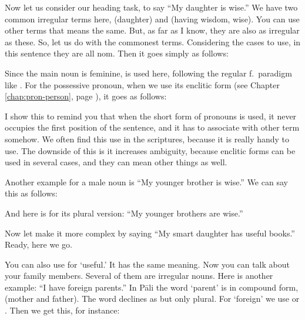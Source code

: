 Now let us consider our heading task, to say ``My daughter is wise.'' We have two common irregular terms here,  (daughter) and  (having wisdom, wise). You can use other terms that means the same. But, as far as I know, they are also as irregular as these. So, let us do with the commonest terms. Considering the cases to use, in this sentence they are all nom. Then it goes simply as follows:


Since the main noun is feminine,  is used here, following the regular f.\ paradigm like . For the possessive pronoun, when we use its enclitic form (see Chapter \ref{chap:pron-person}, page \pageref{par:enclitic}), it goes as follows:


I show this to remind you that when the short form of pronouns is used, it never occupies the first position of the sentence, and it has to associate with other term somehow. We often find this use in the scriptures, because it is really handy to use. The downside of this is it increases ambiguity, because enclitic forms can be used in several cases, and they can mean other things as well.

Another example for a male noun is ``My younger brother is wise.'' We can say this as follows:


And here is for its plural version: ``My younger brothers are wise.''


Now let make it more complex by saying ``My smart daughter has useful books.'' Ready, here we go.


You can also use  for `useful.' It has the same meaning. Now you can talk about your family members. Several of them are irregular nouns. Here is another example: ``I have foreign parents.'' In P\=ali the word `parent' is in compound form,  (mother and father). The word declines as  but only plural. For `foreign' we use  or . Then we get this, for instance:


